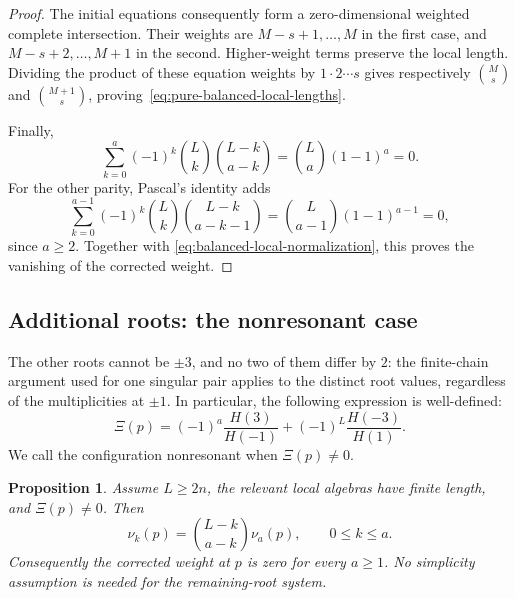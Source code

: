 \documentclass[11pt]{article}
\newtheorem{proposition}{Proposition}[section]
\theoremstyle{definition}
\begin{document}
\begin{proof}
The initial equations consequently form a zero-dimensional weighted
complete intersection. Their weights are
$M-s+1,\ldots,M$ in the first case, and
$M-s+2,\ldots,M+1$ in the second. Higher-weight terms preserve the
local length. Dividing the product of these equation weights by
$1\cdot2\cdots s$ gives respectively $\binom Ms$ and
$\binom{M+1}s$, proving~\eqref{eq:pure-balanced-local-lengths}.

Finally,
\[
 \sum_{k=0}^a(-1)^k\binom Lk\binom{L-k}{a-k}
 =\binom La(1-1)^a=0.
\]
For the other parity, Pascal's identity adds
\[
 \sum_{k=0}^{a-1}(-1)^k\binom Lk\binom{L-k}{a-k-1}
 =\binom L{a-1}(1-1)^{a-1}=0,
\]
since $a\ge2$. Together with
\eqref{eq:balanced-local-normalization}, this proves the vanishing
of the corrected weight.
\end{proof}

\subsection{Additional roots: the nonresonant case}

The other roots cannot be $\pm3$, and no two of them differ by $2$:
the finite-chain argument used for one singular pair applies to the
distinct root values, regardless of the multiplicities at $\pm1$.
In particular, the following expression is well-defined:
\begin{equation}\label{eq:balanced-resonance-function}
 \Xi(p)=(-1)^a\frac{H(3)}{H(-1)}
           +(-1)^L\frac{H(-3)}{H(1)}.
\end{equation}
We call the configuration nonresonant when $\Xi(p)\ne0$.

\begin{proposition}\label{prop:balanced-nonresonant}
Assume $L\ge2n$, the relevant local algebras have finite length, and
$\Xi(p)\ne0$. Then
\[
 \nu_k(p)=\binom{L-k}{a-k}\nu_a(p),\qquad 0\le k\le a.
\]
Consequently the corrected weight at $p$ is zero for every $a\ge1$.
No simplicity assumption is needed for the remaining-root system.
\end{proposition}
\end{document}
